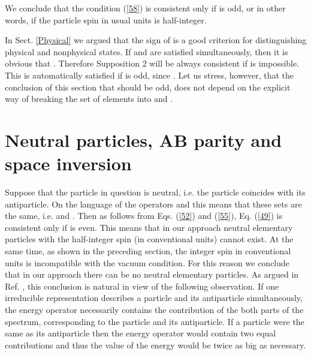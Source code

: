 \documentclass[a4paper,12pt]{article}%
\begin{document}
We conclude that the condition (\ref{58}) is
consistent only if \coordHE{} is odd,
or in other words, if the particle spin in usual units
is half-integer. 

In Sect. \ref{Physical} we argued that the sign of
\coordHE{} is a good criterion for 
distinguishing physical and nonphysical states. If
\coordHE{} and \coordHE{} are satisfied 
simultaneously, then it is obvious that \coordHE{}.
Therefore Supposition 2 will be always consistent
if \coordHE{} is impossible. This is automatically
satisfied if \coordHE{} is odd, since \coordHE{}. 
Let us stress, however, that the conclusion of this
section that \coordHE{} should be odd, does not depend on 
the explicit way of breaking the set 
of elements \coordHE{} into \coordHE{} and \coordHE{}.  

\section{Neutral particles, AB\coordHE{} parity and space
inversion}
\label{S8}  
 
Suppose that the particle in question is neutral, i.e.
the particle coincides with its antiparticle. On the language
of the operators \coordHE{} and \coordHE{} this means that these
sets are the same, i.e. \coordHE{} and
\coordHE{}. Then as follows from
Eqs. (\ref{52}) and (\ref{55}), Eq. (\ref{49}) is
consistent only if \coordHE{} is even. This means that in 
our approach neutral elementary particles with
the half-integer spin (in conventional units) cannot
exist. At the same time, as shown in the preceding section,
the integer spin in conventional units is incompatible
with the vacuum condition. For this reason we conclude
that in our approach there can be no neutral elementary
particles. As argued in Ref. \cite{lev2}, this conclusion
is natural in view of the following observation. 
If one irreducible representation describes a 
particle and its antiparticle simultaneously, the energy 
operator necessarily contains the contribution of
the both parts of the spectrum, corresponding to the particle
and its antiparticle. If a particle were the same as 
its antiparticle then the energy operator would 
contain two equal contributions and thus the value of 
the energy would be twice as big as necessary. 
\end{document}
